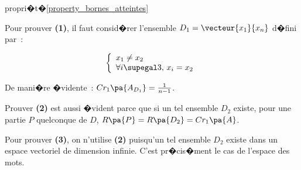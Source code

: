 \begin{xdemo}{propri�t�}{\ref{property_bornes_atteintes}}

Pour prouver \textbf{(1)}, il faut consid�rer l'ensemble $D_1 = \vecteur{x_1}{x_n}$ d�fini par~:

    $$
    \left\{
    \begin{array}{l}
    x_1 \neq x_2 \\
    \forall i \supegal 3, \, x_i = x_2
    \end{array}
    \right.
    $$
    
De mani�re �vidente~: $Cr_1\pa{A_{D_1}} = \frac{1}{n-1}$.

Prouver \textbf{(2)} est aussi �vident parce que si un tel ensemble $D_2$ existe, pour une partie $P$ quelconque de $D$, $R\pa{P} = R\pa{D_2} = Cr_1\pa{A}$.

Pour prouver \textbf{(3)}, on n'utilise \textbf{(2)} puisqu'un tel ensemble $D_2$ existe dans un espace vectoriel de dimension infinie. C'est pr�cis�ment le cas de l'espace des mots.

\end{xdemo}


